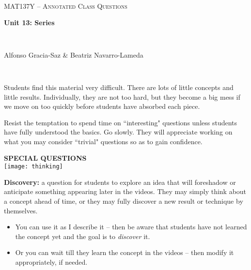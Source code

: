\documentclass[11pt]{article}
\begin{document}
\thispagestyle{empty}
	\begin{center}
		{ {\LARGE  \scshape
		\textcolor{137cp3}{MAT137Y --   Annotated Class Questions}
		}
		
		\medskip
		{\bf \Large \textcolor{137cp1}{Unit 13: Series
		}}
		
		\
		
		\medskip
		{\large
		\textcolor{137cp1}{Alfonso Gracia-Saz \& Beatriz Navarro-Lameda}
		}}
	\end{center}

\vspace{3mm}

\begin{warning}
\ \vspace{-3mm}

	Students find this material very difficult.  There are lots of little concepts and little results.  Individually, they are not too hard, but they become a big mess if we move on too quickly before students have absorbed each piece.
\vspace{3mm}
	
	Resist the temptation to spend time on ``interesting" questions unless students have fully understood the basics.   Go slowly.  They will appreciate working on what you may consider ``trivial" questions so as to gain confidence.
\end{warning}

\vspace{5mm}

{\bf SPECIAL QUESTIONS}\\


	\hspace{-1.3cm} {\texttt{[image: thinking]}}\\
	\vspace{-1.5cm}
	
	  {\bf Discovery: }  a question for students to explore an idea that will foreshadow or anticipate something appearing later in the videos.  They may simply think about a concept ahead of time, or they may fully discover a new result or technique by themselves.
		\begin{itemize}
			\item You can use it as I describe it -- then be aware that students have not learned the concept yet and the goal is to \emph{discover} it.
			\item Or you can wait till they learn the concept in the videos -- then modify it appropriately, if needed.	\\
		\end{itemize}
\end{document}
